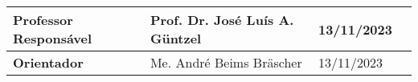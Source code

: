 \begin{folhadeaprovacao}
{\begin{tabular}{| p{3.4cm}| p{2.35cm}| p{1.4cm}| p{5.4cm}|}
			    {\tiny \textbf{Professor Responsável}} &  {\tiny Prof. Dr. José Luís A. Güntzel} & {\tiny 13/11/2023} & \\ \hline
                {\tiny \textbf{Orientador}} &  {\tiny Me. André Beims Bräscher} & {\tiny 13/11/2023} & \\ \hline

		\end{tabular}
	}


\end{folhadeaprovacao}



	



